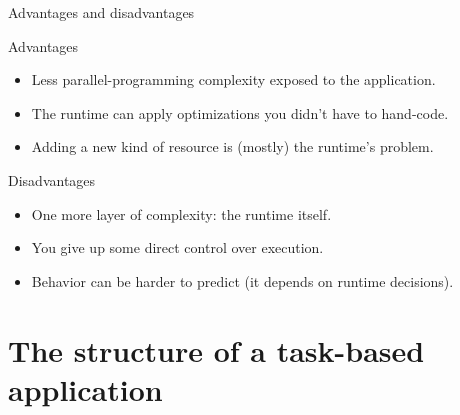 \documentclass[presentation, aspectratio=169]{beamer}
\begin{document}
\begin{frame}[label={sec:org8845e2e}]{Advantages and disadvantages}
\begin{block}{Advantages}
\begin{itemize}
\item Less parallel-programming complexity exposed to the application.
\item The runtime can apply optimizations you didn't have to hand-code.
\item Adding a new kind of resource is (mostly) the runtime's problem.
\end{itemize}
\end{block}
\begin{block}{Disadvantages}
\begin{itemize}
\item One more layer of complexity: the runtime itself.
\item You give up some direct control over execution.
\item Behavior can be harder to predict (it depends on runtime decisions).
\end{itemize}
\end{block}
\end{frame}
\section{The structure of a task-based application}
\label{sec:org33a5f83}
\end{document}
